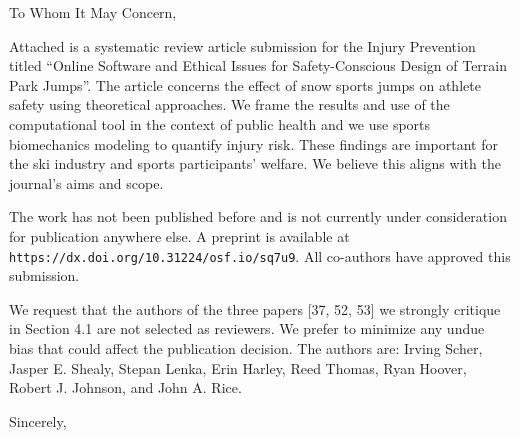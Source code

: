 \documentclass[en]{tuletter}
\date{October 21, 2021}
\begin{document}
\makeheader
\opening{To Whom It May Concern,}

Attached is a systematic review article submission for the Injury Prevention
titled ``Online Software and Ethical Issues for Safety-Conscious Design of
Terrain Park Jumps''. The article concerns the effect of snow sports jumps on
athlete safety using theoretical approaches. We frame the results and use of
the computational tool in the context of public health and we use sports
biomechanics modeling to quantify injury risk. These findings are important for
the ski industry and sports participants' welfare. We believe this aligns with
the journal's aims and scope.

The work has not been published before and is not currently under consideration
for publication anywhere else. A preprint is available at
\verb|https://dx.doi.org/10.31224/osf.io/sq7u9|. All co-authors have approved
this submission.

We request that the authors of the three papers [37, 52, 53] we strongly
critique in Section 4.1 are not selected as reviewers. We prefer to minimize
any undue bias that could affect the publication decision. The authors are:
Irving Scher, Jasper E. Shealy, Stepan Lenka, Erin Harley, Reed Thomas, Ryan
Hoover, Robert J. Johnson, and John A. Rice.

\closing{Sincerely,}
\end{document}
